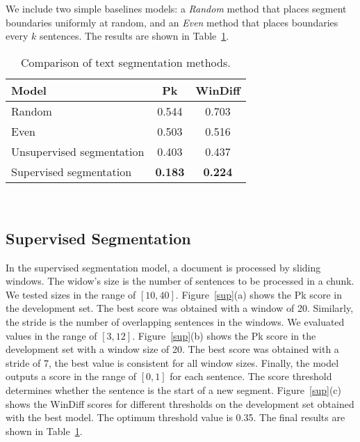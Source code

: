 \documentclass[sigconf]{acmart}
\begin{document}
We include two simple baselines models: a \emph{Random} method that places segment boundaries uniformly at random, and an \emph{Even} method that places boundaries every $k$ sentences. The results are shown in Table~\ref{tab:results:unsup2}.

\begin{table}
	\centering
\begin{tabular}{l c c } 
		\toprule
		\textbf{Model} & \textbf{Pk}	&  \textbf{WinDiff} \\ \hline
        Random&	0.544&	0.703\\
        Even&	0.503&	0.516\\
        Unsupervised segmentation & 0.403&	0.437\\ 
        Supervised segmentation & \textbf{0.183} &	\textbf{0.224}\\
        \bottomrule
    \end{tabular} 
\caption{Comparison of text segmentation methods.}
	\label{tab:results:unsup2}
\end{table}

\begin{figure*}[ht]
 \hspace{\fill}
    \hspace{\fill}
   \\
\caption{Hyper-parameter tuning for the supervised segmentation model. (a) Window; (b) Stride; (c) Threshold.}
\label{sup}
\end{figure*}

\subsection{Supervised Segmentation}
In the supervised segmentation model, a document is processed by sliding windows. The widow’s size is the number of sentences to be processed in a chunk. We tested sizes in the range of $[10, 40]$. Figure~\ref{sup}(a) shows the Pk score in the development set. The best score was obtained with a window of 20. Similarly, the stride is the number of overlapping sentences in the windows. We evaluated values in the range of $[3, 12]$. Figure~\ref{sup}(b) shows the Pk score in the development set with a window size of 20. The best score was obtained with a stride of 7, the best value is consistent for all window sizes. Finally, the model outputs a score in the range of $[0,1]$ for each sentence. The score threshold determines whether the sentence is the start of a new segment. Figure~\ref{sup}(c) shows the WinDiff scores for different thresholds on the development set obtained with the best model. The optimum threshold value is 0.35. The final results are shown in Table~\ref{tab:results:unsup2}.
\end{document}
